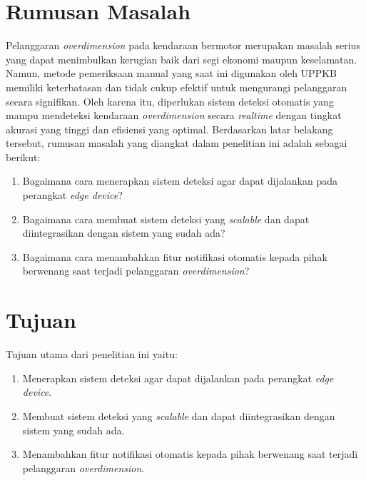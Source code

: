 \section{Rumusan Masalah}
\label{sec:rumusanmasalah}

Pelanggaran \emph{overdimension} pada kendaraan bermotor merupakan masalah serius yang dapat menimbulkan kerugian baik dari segi ekonomi maupun keselamatan. Namun, metode pemeriksaan manual yang saat ini digunakan oleh UPPKB memiliki keterbatasan dan tidak cukup efektif untuk mengurangi pelanggaran secara signifikan. Oleh karena itu, diperlukan sistem deteksi otomatis yang mampu mendeteksi kendaraan \emph{overdimension} secara \emph{realtime} dengan tingkat akurasi yang tinggi dan efisiensi yang optimal. Berdasarkan latar belakang tersebut, rumusan masalah yang diangkat dalam penelitian ini adalah sebagai berikut:

\begin{enumerate}[nolistsep]

  \item Bagaimana cara menerapkan sistem deteksi agar dapat dijalankan pada perangkat \emph{edge device}?
  
  \item Bagaimana cara membuat sistem deteksi yang \emph{scalable} dan dapat diintegrasikan dengan sistem yang sudah ada?
  
  \item Bagaimana cara menambahkan fitur notifikasi otomatis kepada pihak berwenang saat terjadi pelanggaran \emph{overdimension}?
  
\end{enumerate}

\section{Tujuan}
\label{sec:Tujuan}

Tujuan utama dari penelitian ini yaitu:

\begin{enumerate}[nolistsep]

  \item Menerapkan sistem deteksi agar dapat dijalankan pada perangkat \emph{edge device}.
  
  \item Membuat sistem deteksi yang \emph{scalable} dan dapat diintegrasikan dengan sistem yang sudah ada.
  
  \item Menambahkan fitur notifikasi otomatis kepada pihak berwenang saat terjadi pelanggaran \emph{overdimension}.
  
\end{enumerate}

